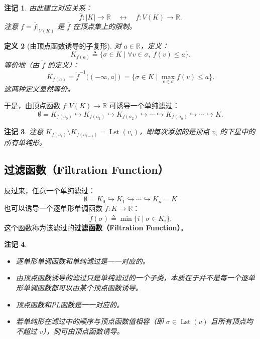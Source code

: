 \documentclass[UTF8]{ctexart}
\newtheorem{definition}{定义}[section]
\newtheorem{remark}[definition]{注记}
\begin{document}
\begin{remark}
由此建立对应关系：
\[
\bar{f}: |K| \to \mathbb{R} \quad \longleftrightarrow \quad f: V(K) \to \mathbb{R}.
\]
注意 \(f = \bar{f}|_{V(K)}\) 是 \(\bar{f}\) 在顶点集上的限制。
\end{remark}

\begin{definition}[由顶点函数诱导的子复形]
\label{def:vertex-sublevel}
对 \(a \in \mathbb{R}\)，定义：
\[
K_{f(a)} \triangleq \{\sigma \in K \mid \forall v \in \sigma,\ f(v) \le a\}.
\]
等价地（由 \(\tilde{f}\) 的定义）：
\[
K_{f(a)} = \tilde{f}^{-1}((-\infty, a]) = \{\sigma \in K \mid \max_{v\in\sigma} f(v) \le a\}.
\]
这两种定义显然等价。
\end{definition}

于是，由顶点函数 \(f: V(K) \to \mathbb{R}\) 可诱导一个单纯滤过：
\[
\emptyset = K_{f(a_0)} \hookrightarrow K_{f(a_1)} \hookrightarrow K_{f(a_2)} \hookrightarrow \cdots \hookrightarrow K_{f(a_n)} \hookrightarrow \cdots \hookrightarrow K.
\]

\begin{remark}
注意 \(K_{f(a_i)} \setminus K_{f(a_{i-1})} = \operatorname{Lst}(v_i)\)，即每次添加的是顶点 \(v_i\) 的下星中的所有单纯形。
\end{remark}

\subsection{过滤函数（Filtration Function）}
\label{subsec:filtration-function}

反过来，任意一个单纯滤过：
\[
\emptyset = K_0 \hookrightarrow K_1 \hookrightarrow \cdots \hookrightarrow K_n = K
\]
也可以诱导一个逐单形单调函数 \(\tilde{f}: K \to \mathbb{R}\)：
\[
\tilde{f}(\sigma) \triangleq \min\{i \mid \sigma \in K_i\}.
\]
这个函数称为该滤过的\textbf{过滤函数（Filtration Function）}。

\begin{remark}
\begin{itemize}
    \item 逐单形单调函数和单纯滤过是一一对应的。
    \item 由顶点函数诱导的滤过只是单纯滤过的一个子类，本质在于并不是每一个逐单形单调函数都可以由某个顶点函数诱导。
	\item 顶点函数和PL函数是一一对应的。
    \item 若单纯形在滤过中的顺序与顶点函数值相容（即 \(\sigma \in \operatorname{Lst}(v)\) 且所有顶点均不超过 \(v\)），则可由顶点函数诱导。
\end{itemize}
\end{remark}
\end{document}
